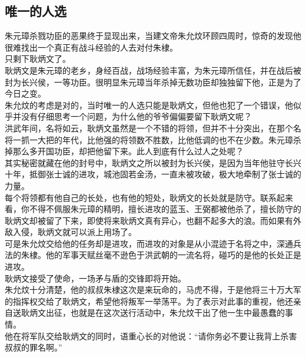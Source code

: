 \begin{multicols}{\theparacolNo}
\subsection{唯一的人选}
朱元璋杀戮功臣的恶果终于显现出来，当建文帝朱允炆环顾四周时，惊奇的发现他很难找出一个真正有战斗经验的人去对付朱棣。\\

只剩下耿炳文了。\\

耿炳文是朱元璋的老乡，身经百战，战场经验丰富，为朱元璋所信任，并在战后被封为长兴侯，一等功臣。很明显朱元璋当年杀掉无数功臣却独独留下他，正是为了今日之变。\\

朱允炆的考虑是对的，当时唯一的人选只能是耿炳文，但他也犯了一个错误，他似乎并没有仔细思考一个问题，为什么他的爷爷偏偏要留下耿炳文呢？\\

洪武年间，名将如云，耿炳文虽然是一个不错的将领，但并不十分突出，在那个名将一抓一大把的年代，比他强的将领数不胜数，比他低调的也不在少数。朱元璋杀掉那么多开国功臣，却把他留下来。此人到底有什么过人之处呢？\\

其实秘密就藏在他的封号中，耿炳文之所以被封为长兴侯，是因为当年他驻守长兴十年，抵御张士诚的进攻，城池固若金汤，一直未被攻破，极大地牵制了张士诚的力量。\\

每个将领都有他自己的长处，也有他的短处，耿炳文的长处就是防守。联系起来看，你不得不佩服朱元璋的精明，擅长进攻的蓝玉、王弼都被他杀了，擅长防守的耿炳文却被留了下来，即使将来耿炳文真有异心，也翻不起多大的浪。而如果有外敌入侵，耿炳文就可以派上用场了。\\

可是朱允炆交给他的任务却是进攻，而进攻的对象是从小混迹于名将之中，深通兵法的朱棣。他的军事天赋丝毫不逊色于洪武朝的一流名将，碰巧的是他的长处正是进攻。\\

耿炳文接受了使命，一场矛与盾的交锋即将开始。\\

朱允炆十分清楚，他的叔叔朱棣这次是来玩命的，马虎不得，于是他将三十万大军的指挥权交给了耿炳文，希望他将叛军一举荡平。为了表示对此事的重视，他还亲自送耿炳文出征，也就是在这次送行活动中，朱允炆干出了他一生中最愚蠢的事情。\\

他在将军队交给耿炳文的同时，语重心长的对他说：“请你务必不要让我背上杀害叔叔的罪名啊。”\\


\end{multicols}
